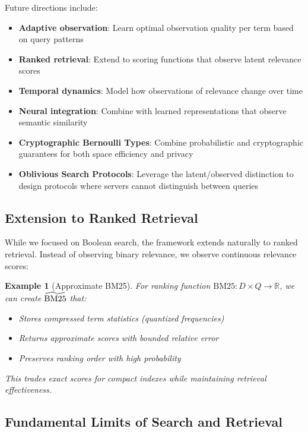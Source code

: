 \documentclass[11pt,final,hidelinks]{article}
\newtheorem{example}[theorem]{Example}
\begin{document}
Future directions include:
\begin{itemize}
    \item \textbf{Adaptive observation}: Learn optimal observation quality per term based on query patterns
    \item \textbf{Ranked retrieval}: Extend to scoring functions that observe latent relevance scores
    \item \textbf{Temporal dynamics}: Model how observations of relevance change over time
    \item \textbf{Neural integration}: Combine with learned representations that observe semantic similarity
    \item \textbf{Cryptographic Bernoulli Types}: Combine probabilistic and cryptographic guarantees for both space efficiency and privacy
    \item \textbf{Oblivious Search Protocols}: Leverage the latent/observed distinction to design protocols where servers cannot distinguish between queries
\end{itemize}

\subsection{Extension to Ranked Retrieval}

While we focused on Boolean search, the framework extends naturally to ranked retrieval. Instead of observing binary relevance, we observe continuous relevance scores:

\begin{example}[Approximate BM25]
For ranking function $\text{BM25}: D \times Q \to \mathbb{R}$, we can create $\widetilde{\text{BM25}}$ that:
\begin{itemize}
    \item Stores compressed term statistics (quantized frequencies)
    \item Returns approximate scores with bounded relative error
    \item Preserves ranking order with high probability
\end{itemize}
This trades exact scores for compact indexes while maintaining retrieval effectiveness.
\end{example}

\subsection{Fundamental Limits of Search and Retrieval}
\end{document}
